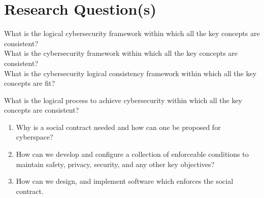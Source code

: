 \section{Research Question(s)}
\if
What is the logical cybersecurity framework within which all the key concepts are consistent?\\
What is the cybersecurity framework within which all the key concepts are consistent?\\
What is the cybersecurity logical consistency framework within which all the key concepts are fit?\\
\fi

What is the logical process to achieve cybersecurity within which all the key concepts are consistent?
\begin{enumerate}
\item Why is a social contract needed and how can one be proposed for cyberspace?
\item How can we develop and configure a collection of enforceable conditions to maintain safety, privacy, security, and any other key objectives?
\item How can we design, and implement software which enforces the social contract.%
\end{enumerate}



